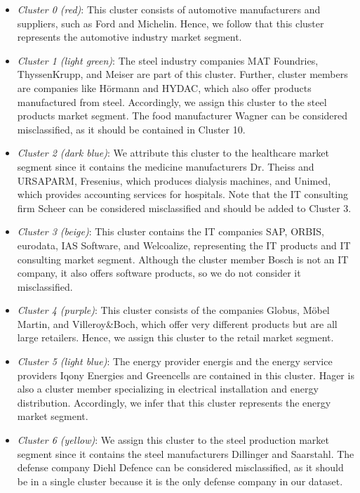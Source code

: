 \documentclass[conference]{IEEEtran}
\begin{document}
\begin{itemize}
	\item \textit{Cluster 0 (red)}: This cluster consists of automotive manufacturers and suppliers, such as Ford and Michelin. Hence, we follow that this cluster represents the automotive industry market segment.
	
	\item \textit{Cluster 1 (light green)}: The steel industry companies MAT Foundries, ThyssenKrupp, and Meiser are part of this cluster. Further, cluster members are companies like Hörmann and HYDAC, which also offer products manufactured from steel. Accordingly, we assign this cluster to the steel products market segment. The food manufacturer Wagner can be considered misclassified, as it should be contained in Cluster 10.
	
	\item \textit{Cluster 2 (dark blue)}: We attribute this cluster to the healthcare market segment since it contains the medicine manufacturers Dr. Theiss and URSAPARM, Fresenius, which produces dialysis machines, and Unimed, which provides accounting services for hospitals. Note that the IT consulting firm Scheer can be considered misclassified and should be added to Cluster 3.
	
	\item \textit{Cluster 3 (beige)}: This cluster contains the IT companies SAP, ORBIS, eurodata, IAS Software, and Welcoalize, representing the IT products and IT consulting market segment. Although the cluster member Bosch is not an IT company, it also offers software products, so we do not consider it misclassified.
	
	\item \textit{Cluster 4 (purple)}: This cluster consists of the companies Globus, Möbel Martin, and Villeroy\&Boch, which offer very different products but are all large retailers. Hence, we assign this cluster to the retail market segment. 
	
	\item \textit{Cluster 5 (light blue)}: The energy provider energis and the energy service providers Iqony Energies and Greencells are contained in this cluster. Hager is also a cluster member specializing in electrical installation and energy distribution. Accordingly, we infer that this cluster represents the energy market segment.
	
	\item \textit{Cluster 6 (yellow)}: We assign this cluster to the steel production market segment since it contains the steel manufacturers Dillinger and Saarstahl. The defense company Diehl Defence can be considered misclassified, as it should be in a single cluster because it is the only defense company in our dataset.
	

\end{itemize}
\end{document}
